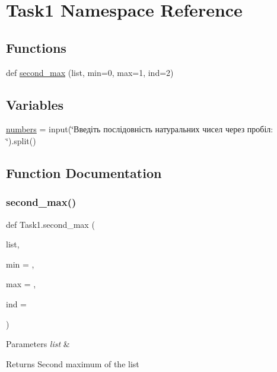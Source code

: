 \hypertarget{namespace_task1}{}\section{Task1 Namespace Reference}
\label{namespace_task1}
\subsection*{Functions}
\begin{DoxyCompactItemize}
\item 
def \hyperlink{namespace_task1_aceb62e04047b70da811eba2d702ea1ba}{second\+\_\+max} (list, min=0, max=1, ind=2)
\end{DoxyCompactItemize}
\subsection*{Variables}
\begin{DoxyCompactItemize}
\item 
\hyperlink{namespace_task1_a8688e924bd52aeda371ffca58506db7f}{numbers} = input(\char`\"{}Введіть послідовність натуральних чисел через пробіл\+: \char`\"{}).split()
\end{DoxyCompactItemize}


\subsection{Function Documentation}
\mbox{\label{namespace_task1_aceb62e04047b70da811eba2d702ea1ba}} 
\subsubsection{\texorpdfstring{second\+\_\+max()}{second\_max()}}
{\footnotesize\ttfamily def Task1.\+second\+\_\+max (\begin{DoxyParamCaption}\item[{}]{list,  }\item[{}]{min = {},  }\item[{}]{max = {},  }\item[{}]{ind = {} }\end{DoxyParamCaption})}


\begin{DoxyParams}{Parameters}
{\em list} & \\
\hline
\end{DoxyParams}
\begin{DoxyReturn}{Returns}
Second maximum of the list 
\end{DoxyReturn}


